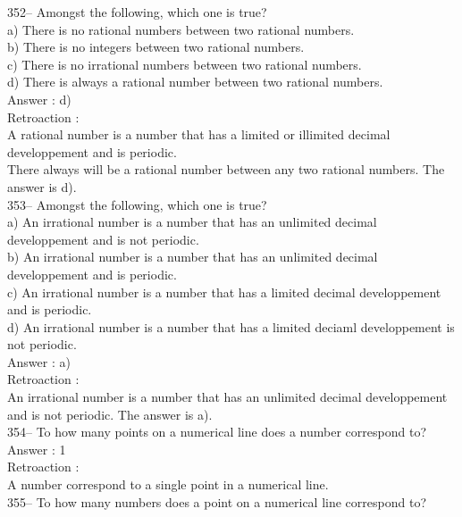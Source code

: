 ﻿\documentclass[letterpaper, 12pt]{article}
\begin{document}
352-- Amongst the following, which one is true?\\
a) There is no rational numbers between two rational numbers.\\
b) There is no integers between two rational numbers.\\
c) There is no irrational numbers between two rational numbers.\\
d) There is always a rational number between two rational numbers.\\

Answer : d)\\

Retroaction :\\
A rational number is a number that has a limited or illimited decimal developpement and is periodic.\\
There always will be a rational number between any two rational numbers.
The answer is d).\\

353-- Amongst the following, which one is true?\\
a) An irrational number is a number that has an unlimited decimal developpement and is not periodic.\\
b) An irrational number is a number that has an unlimited decimal developpement and is periodic.\\
c) An irrational number is a number that has a limited decimal developpement and is periodic.\\
d) An irrational number is a number that has a limited deciaml developpement is not periodic.\\

Answer : a)\\

Retroaction : \\
An irrational number is a number that has an unlimited decimal developpement and is not periodic. 
The answer is a).\\

354-- To how many points on a numerical line does a number correspond to?\\

Answer : 1\\

Retroaction : \\
A number correspond to a single point in a numerical line.\\

355-- To how many numbers does a point on a numerical line correspond to?\\
\end{document}
